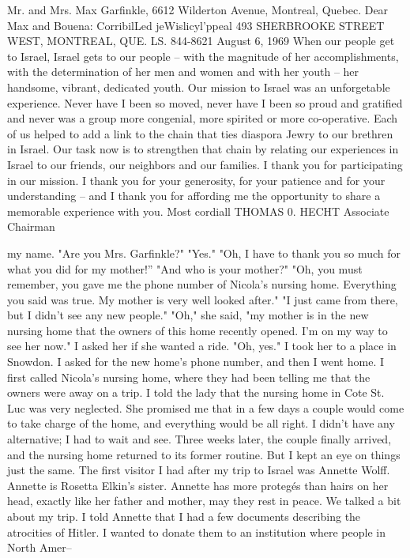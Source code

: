 Mr. and Mrs. Max Garfinkle, 
6612 Wilderton Avenue, 
Montreal, Quebec. 
Dear Max and Bouena: 
CorribilLed jeWislicyl'ppeal 
493 SHERBROOKE STREET WEST, MONTREAL, QUE. LS. 844-8621 
August 6, 1969 
When our people get to Israel, Israel gets to our 
people -- with the magnitude of her accomplishments, with the 
determination of her men and women and with her youth -- her 
handsome, vibrant, dedicated youth. 
Our mission to Israel was an unforgetable experience. 
Never have I been so moved, never have I been so proud and 
gratified and never was a group more congenial, more spirited 
or more co-operative. 
Each of us helped to add a link to the chain that 
ties diaspora Jewry to our brethren in Israel. Our task now 
is to strengthen that chain by relating our experiences in 
Israel to our friends, our neighbors and our families. 
I thank you for participating in our mission. I 
thank you for your generosity, for your patience and for your 
understanding -- and I thank you for affording me the opportunity 
to share a memorable experience with you. 
Most cordiall 
THOMAS 0. HECHT 
Associate Chairman 

my name. 
"Are you Mrs. Garfinkle?" 
"Yes." 
"Oh, I have to thank you so much for what you did for my mother!” 
"And who is your mother?" 
"Oh, you must remember, you gave me the phone number of Nicola's 
nursing home. Everything you said was true. My mother is very well 
looked after." 
"I just came from there, but I didn't see any new people." 
"Oh," she said, "my mother is in the new nursing home that the 
owners of this home recently opened. I'm on my way to see her now." 
I asked her if she wanted a ride. 
"Oh, yes." 
I took her to a place in Snowdon. I asked for the new home's 
phone number, and then I went home. I first called Nicola's nursing 
home, where they had been telling me that the owners were away on 
a trip. I told the lady that the nursing home in Cote St. Luc was 
very neglected. She promised me that in a few days a couple would 
come to take charge of the home, and everything would be all right. 
I didn't have any alternative; I had to wait and see. 
Three weeks later, the couple finally arrived, and the nursing 
home returned to its former routine. But I kept an eye on things 
just the same. 
The first visitor I had after my trip to Israel was Annette 
Wolff. Annette is Rosetta Elkin's sister. Annette has more protegés than hairs on her head, exactly like her father and mother, may 
they rest in peace. We talked a bit about my trip. I told Annette 
that I had a few documents describing the atrocities of Hitler. I 
wanted to donate them to an institution where people in North Amer--

